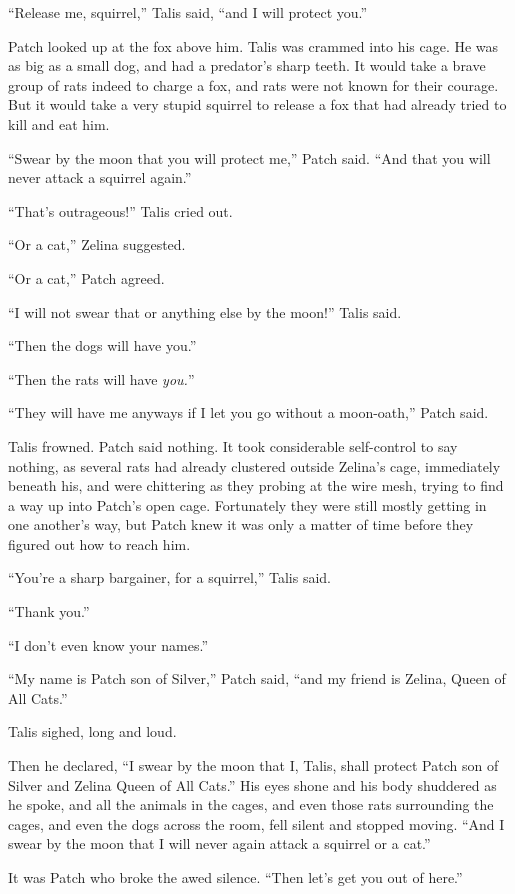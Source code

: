 \documentclass[ebook,oneside,openany,17pt]{memoir}
\begin{document}
“Release me, squirrel,” Talis said, “and I will protect you.”

Patch looked up at the fox above him. Talis was crammed into his
cage. He was as big as a small dog, and had a predator’s sharp
teeth. It would take a brave group of rats indeed to charge a fox, and
rats were not known for their courage. But it would take a very stupid
squirrel to release a fox that had already tried to kill and eat him.

“Swear by the moon that you will protect me,” Patch said. “And that
you will never attack a squirrel again.”

“That’s outrageous!” Talis cried out.

“Or a cat,” Zelina suggested.

“Or a cat,” Patch agreed.

“I will not swear that or anything else by the moon!” Talis said.

“Then the dogs will have you.”

“Then the rats will have \emph{you.}”

“They will have me anyways if I let you go without a moon-oath,” Patch
said.

Talis frowned. Patch said nothing. It took considerable self-control
to say nothing, as several rats had already clustered outside Zelina’s
cage, immediately beneath his, and were chittering as they probing at
the wire mesh, trying to find a way up into Patch’s open
cage. Fortunately they were still mostly getting in one another’s way,
but Patch knew it was only a matter of time before they figured out
how to reach him.

“You’re a sharp bargainer, for a squirrel,” Talis said.

“Thank you.”

“I don’t even know your names.”

“My name is Patch son of Silver,” Patch said, “and my friend is
Zelina, Queen of All Cats.”

Talis sighed, long and loud.

Then he declared, “I swear by the moon that I, Talis, shall protect
Patch son of Silver and Zelina Queen of All Cats.” His eyes shone and
his body shuddered as he spoke, and all the animals in the cages, and
even those rats surrounding the cages, and even the dogs across the
room, fell silent and stopped moving. “And I swear by the moon that I
will never again attack a squirrel or a cat.”

It was Patch who broke the awed silence. “Then let’s get you out of
here.”
\end{document}
